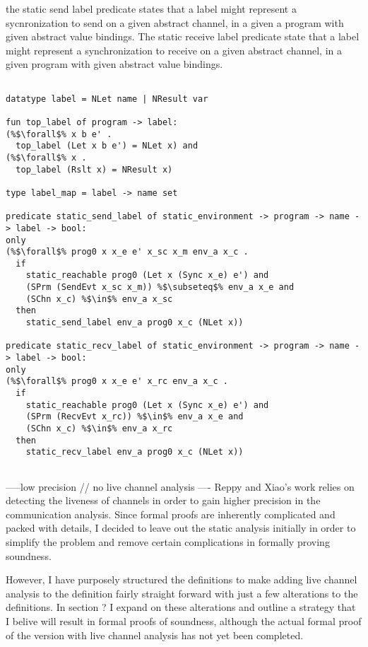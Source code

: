 \documentclass{article}
\begin{document}
the static send label predicate states that a label might represent a sycnronization to send on
a given abstract channel, in a given a program with given abstract value bindings.  The static
receive label predicate state that a label might represent a synchronization to receive on a
given abstract channel, in a given program with given abstract value bindings. 

\begin{lstlisting}[language=logic, style=codestyle1, escapechar=\%]

datatype label = NLet name | NResult var

fun top_label of program -> label:
(%$\forall$% x b e' . 
  top_label (Let x b e') = NLet x) and
(%$\forall$% x . 
  top_label (Rslt x) = NResult x)

type label_map = label -> name set

predicate static_send_label of static_environment -> program -> name -> label -> bool:
only
(%$\forall$% prog0 x x_e e' x_sc x_m env_a x_c .
  if
    static_reachable prog0 (Let x (Sync x_e) e') and
    (SPrm (SendEvt x_sc x_m)) %$\subseteq$% env_a x_e and 
    (SChn x_c) %$\in$% env_a x_sc
  then
    static_send_label env_a prog0 x_c (NLet x))

predicate static_recv_label of static_environment -> program -> name -> label -> bool:
only
(%$\forall$% prog0 x x_e e' x_rc env_a x_c .
  if
    static_reachable prog0 (Let x (Sync x_e) e') and
    (SPrm (RecvEvt x_rc)) %$\in$% env_a x_e and 
    (SChn x_c) %$\in$% env_a x_rc 
  then
    static_recv_label env_a prog0 x_c (NLet x))


\end{lstlisting}

-----low precision // no live channel analysis ----
Reppy and Xiao's work relies on detecting the liveness of channels in order to gain higher
precision in the communication analysis.  Since formal proofs are inherently complicated and
packed with details, I decided to leave out the static analysis initially in order to simplify
the problem and remove certain complications in formally proving soundness.

However, I have purposely
structured the definitions to make adding live channel analysis to the definition fairly  
straight forward with just a few alterations to the definitions.  In section ? I expand on
these alterations and outline a strategy that I belive will result in formal proofs of
soundness,
although the actual formal proof of the version with live channel analysis has not yet been
completed.  
\end{document}
